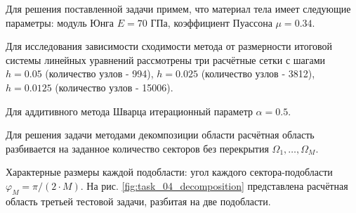 \documentclass[a4paper]{article}
\begin{document}
Для решения поставленной задачи примем, что материал тела имеет следующие параметры: модуль Юнга $E = 70$ ГПа, коэффициент Пуассона $\mu = 0.34$. 

Для исследования зависимости сходимости метода от размерности итоговой системы линейных уравнений рассмотрены три расчётные сетки с шагами $h = 0.05$ (количество узлов - 994), $h = 0.025$ (количество узлов - 3812), $h = 0.0125$ (количество узлов - 15006).

Для аддитивного метода Шварца итерационный параметр $\alpha = 0.5$.

\newpage

Для решения задачи методами декомпозиции области расчётная область разбивается на заданное количество секторов без перекрытия $\Omega_1, \ldots, \Omega_M$. 

Характерные размеры каждой подобласти: угол каждого сектора-подобласти $\varphi_M = \pi / (2 \cdot M)$. На рис. \ref{fig:task_04_decomposition} представлена расчётная область третьей тестовой задачи, разбитая на две подобласти.
\end{document}
